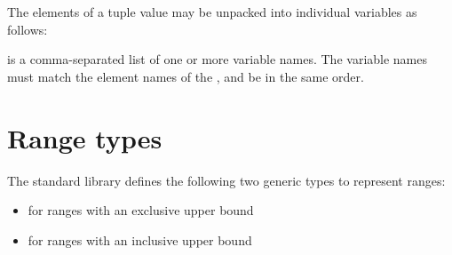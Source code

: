 The elements of a tuple value may be unpacked into individual variables as
follows:

\begin{grammar}
 \textrightarrow{}  \code{=}  \code{;}
\end{grammar}

 is a comma-separated list of one or more variable
names. The variable names must match the element names of the
, and be in the same order.

\section{Range types}

The standard library defines the following two generic types to represent
ranges:

\begin{itemize}
\item {} for ranges with an exclusive upper bound
\item {} for ranges with an inclusive upper bound
\end{itemize}
